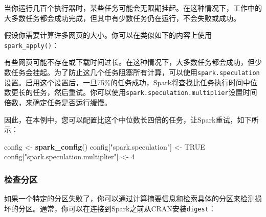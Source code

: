 \documentclass[
]{article}
\newenvironment{Shaded}{\begin{snugshade}}{\end{snugshade}}
\newcommand{\CommentTok}[1]{\textcolor[rgb]{0.56,0.35,0.01}{\textit{#1}}}
\newcommand{\ControlFlowTok}[1]{\textcolor[rgb]{0.13,0.29,0.53}{\textbf{#1}}}
\newcommand{\DataTypeTok}[1]{\textcolor[rgb]{0.13,0.29,0.53}{#1}}
\newcommand{\DecValTok}[1]{\textcolor[rgb]{0.00,0.00,0.81}{#1}}
\newcommand{\KeywordTok}[1]{\textcolor[rgb]{0.13,0.29,0.53}{\textbf{#1}}}
\newcommand{\NormalTok}[1]{#1}
\newcommand{\OperatorTok}[1]{\textcolor[rgb]{0.81,0.36,0.00}{\textbf{#1}}}
\newcommand{\OtherTok}[1]{\textcolor[rgb]{0.56,0.35,0.01}{#1}}
\newcommand{\StringTok}[1]{\textcolor[rgb]{0.31,0.60,0.02}{#1}}
\begin{document}
当你运行几百个执行器时，某些任务可能会无限期挂起。在这种情况下，工作中的大多数任务都会成功完成，但其中有少数任务仍在运行，不会失败或成功。

假设你需要计算许多网页的大小。你可以在类似如下的内容上使用\texttt{spark\_apply()}：

\begin{Shaded}
\end{Shaded}

有些网页可能不存在或下载时间过长。在这种情况下，大多数任务都会成功，但少数任务会挂起。为了防止这几个任务阻塞所有计算，可以使用\texttt{spark.speculation}设置。启用这个设置后，一旦75\%的任务成功，Spark将查找比任务执行时间中位数更长的任务，然后重试。你可以使用\texttt{spark.speculation.multiplier}设置时间倍数，来确定任务是否运行缓慢。

因此，在本例中，您可以配置比这个中位数长四倍的任务，让Spark重试，如下所示：

\begin{Shaded}
\begin{Highlighting}[]
\NormalTok{config <-}\StringTok{ }\KeywordTok{spark_config}\NormalTok{()}
\NormalTok{config[}\StringTok{"spark.speculation"}\NormalTok{] <-}\StringTok{ }\OtherTok{TRUE}
\NormalTok{config[}\StringTok{"spark.speculation.multiplier"}\NormalTok{] <-}\StringTok{ }\DecValTok{4}
\end{Highlighting}
\end{Shaded}

\hypertarget{ux68c0ux67e5ux5206ux533a}{%
\subsubsection{检查分区}\label{ux68c0ux67e5ux5206ux533a}}

如果一个特定的分区失败了，你可以通过计算摘要信息和检索具体的分区来检测损坏的分区。通常，你可以在连接到Spark之前从CRAN安装\texttt{digest}：

\begin{Shaded}
\end{Shaded}
\end{document}
